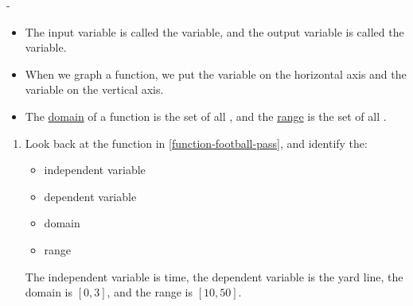 \documentclass{article}
\makeatletter
\newlength{\tipmargin}
\renewenvironment{framed}{
  \setlength{\tipmargin}{\textwidth-\linewidth}
  \advance\@totalleftmargin-\tipmargin
  \def\FrameCommand{\hspace{\tipmargin}\fbox}%
  \advance\linewidth\tipmargin
  \MakeFramed {\advance\hsize-\width \FrameRestore}%
}
{\endMakeFramed}
\makeatother
\begin{document}
\begin{enumerate}
\begin{framed}
\begin{itemize}[nosep]
    \item
      \begin{onehalfspace}
        The input variable is called the  variable, and the output variable is called the  variable.%
      \end{onehalfspace}

    \item
      \begin{onehalfspace}
        When we graph a function, we put the  variable on the horizontal axis and the  variable on the vertical axis.
      \end{onehalfspace}

    \item
      \begin{onehalfspace}
        The \uline{domain} of a function is the set of all , and the \uline{range} is the set of all .
      \end{onehalfspace}

    \end{itemize}
  \end{framed}

  \begin{enumerate}[resume]
  \item


    \begin{problem}[\vfill\newpage]
      Look back at the function in \ref{function-football-pass}, and
      identify the:
      \begin{itemize}
      \item independent variable
      \item dependent variable
      \item domain
      \item range
      \end{itemize}
    \end{problem}

    \begin{solution}
      The independent variable is time, the dependent variable is the
      yard line, the domain is $[0, 3]$, and the range is $[10, 50]$.
    \end{solution}


\end{enumerate}
\end{enumerate}
\end{document}
